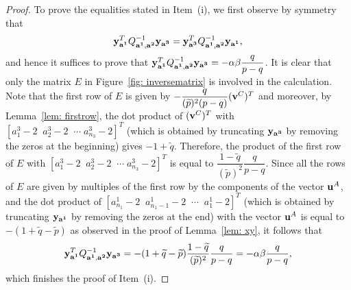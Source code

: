 \documentclass[11pt]{amsart}
\theoremstyle{plain}
\theoremstyle{definition}
\theoremstyle{remark}
\numberwithin{theorem}{section}
\begin{document}
\begin{proof}  To prove the equalities stated in Item~(i), we first observe by symmetry that  
\[
{\bf y}^T_{\bf a^1} Q^{-1}_{{\bf a^1}, {\bf a^2}} {\bf y_{a^3}} = {\bf y}^T_{\bf a^3} Q^{-1}_{{\bf a^1}, {\bf a^2}} {\bf y_{a^1}},
\] 
and hence it suffices to prove that  ${\bf y}^T_{\bf a^1} Q^{-1}_{{\bf a^1}, {\bf a^2}} {\bf y_{a^3}}  =- \alpha \beta \dfrac{q}{p-q}$. It is clear that only the matrix $E$ in Figure~\ref{fig: inversematrix} is involved in the calculation. Note that the first row of $E$ is given by $-\dfrac{q}{(\widetilde{p})^2(p-q)} ({\bf v}^C)^T$ and moreover, by Lemma~\ref{lem: firstrow}, the dot product of  $({\bf v}^C)^T$ with $[a^3_1-2 \; \; a^3_2-2 \; \;  \cdots \; a^3_{n_3}-2]^T$ (which is obtained by truncating ${\bf y_{a^3}}$  by removing the zeros at the beginning) gives $-1+ \widetilde{q}$. Therefore,  the product of the first row of $E$ with $[a^3_1-2 \; \; a^3_2-2 \; \;  \cdots \; a^3_{n_3}-2]^T$  is equal to  $\dfrac{1- \widetilde{q}}{(\widetilde{p})^2} \dfrac{q}{p-q}.$ Since all the rows of $E$ are given by multiples of the first row by the components of  the vector $ {\bf u}^A$, and the dot product of $[a^1_{n_1}-2 \;\; a^1_{n_1-1}-2 \;\; \cdots \;\; a^1_1-2]^T$ (which is obtained by truncating ${\bf y}_{\bf a^1}$ by removing the zeros at the end) with the vector ${\bf u}^A$ is equal to  $-(1+ \widetilde{q} -\widetilde{p})$ as observed in the proof of Lemma~\ref{lem: xy},  it follows that 
\[
{\bf y}^T_{\bf a^1} Q^{-1}_{{\bf a^1}, {\bf a^2}} {\bf y_{a^3}} = -(1+ \widetilde{q} -\widetilde{p}) \dfrac{1- \widetilde{q}}{(\widetilde{p})^2} \dfrac{q}{p-q}= - \alpha \beta \dfrac{q}{p-q},
\] 
which finishes the proof of Item~(i).  



\end{proof}
\end{document}
